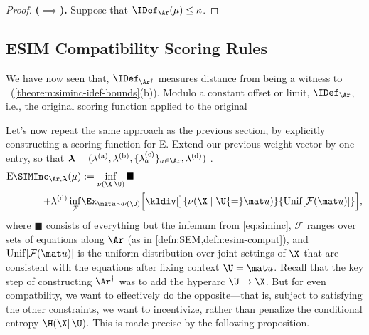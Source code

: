 \begin{subappendices}
{\begin{proof}
    \textbf{($\implies$).}
    Suppose that $\IDef_{\Ar}(\mu) \le \kappa$. 
\end{proof}


\subsection{ESIM Compatibility Scoring Rules}
We have now seen that, $\IDef_{\Ar^\dagger}$ measures distance from 
    being a witness to \scibility\ (\cref{theorem:siminc-idef-bounds}(b)).
Modulo a constant offset or limit, $\IDef_{\Ar}$, i.e., the original scoring function applied to the original \hgraph\ 

Let's now repeat the same approach as the previous section, by explicitly constructing a scoring function for E\scibility.
Extend our previous weight vector by one entry, so that $\boldsymbol\lambda = (\lambda^{\text{(a)}},\lambda^{\text{(b)}},\{\lambda^{\text{(c)}}_a\}_{a \in \Ar}, \lambda^{\text{(d)}})$
\unskip.
%
\begin{align*}
    \mathrm{E}\mskip-1mu\SIMInc_{\Ar, \boldsymbol\lambda}(\mu) 
        &:= 
        \inf_{\nu(\X\!,\,\U)} 
            \blacksquare
        \\ + \lambda^{\text{(d)}}
        \inf_{\mathcal F}& \Ex_{\mat u \sim \nu(\U)}
            \Big[ 
            \kldiv[\big]{ \nu(\X \mid \U{=}\mat u) }{ \mathrm{Unif}[{\mathcal F(\mat u)}] }
            \Big],
\end{align*}
where $\blacksquare$ consists of everything but the infemum from \cref{eq:siminc},
$\mathcal F$ ranges over sets of equations along $\Ar$ (as in \cref{defn:SEM,defn:esim-compat}), and $\mathrm{Unif}[{\mathcal F(\mat u)}]$ is the uniform distribution over joint settings of $\X$ that are consistent with the equations after fixing context $\U = \mat u$. 
Recall that the key step of constructing $\Ar^\dagger$ was to add the hyperarc $\U \to \X$. But for even compatbility, we want to effectively do the opposite---that is, subject to satisfying the other constraints, we want to incentivize, rather than penalize the conditional entropy $\H(\X|\,\U)$. This is made precise by the following proposition.


}
\end{subappendices}
